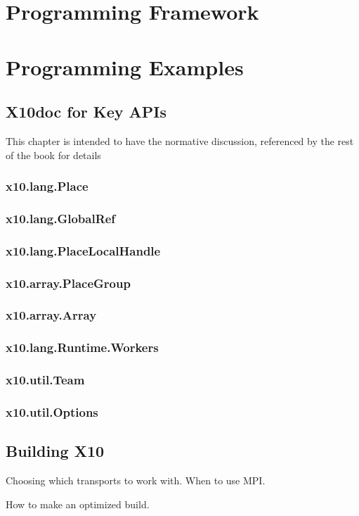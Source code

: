 \documentclass[10pt,twoside,notitlepage]{book}
\begin{document}
\frontmatter
 
\addtolength{\cftsecnumwidth}{0.5em}
\addtolength{\cftsubsecnumwidth}{0.5em}
\addtolength{\cftsecindent}{0.5em}


\clearpage
\tableofcontents

\mainmatter

\part{Programming Framework}




\part{Programming Examples}









\renewcommand{\bibname}{References}



\appendix
\chapter{X10doc for Key APIs}
This chapter is intended to have the normative discussion, referenced
by the rest of the book for details
\section{x10.lang.Place}
\section{x10.lang.GlobalRef}
\section{x10.lang.PlaceLocalHandle}
\section{x10.array.PlaceGroup}
\section{x10.array.Array}
\section{x10.lang.Runtime.Workers}
\section{x10.util.Team}
\section{x10.util.Options}

\chapter{Building X10}
Choosing which transports to work with. When to use MPI.

How to make an optimized build.
\end{document}
